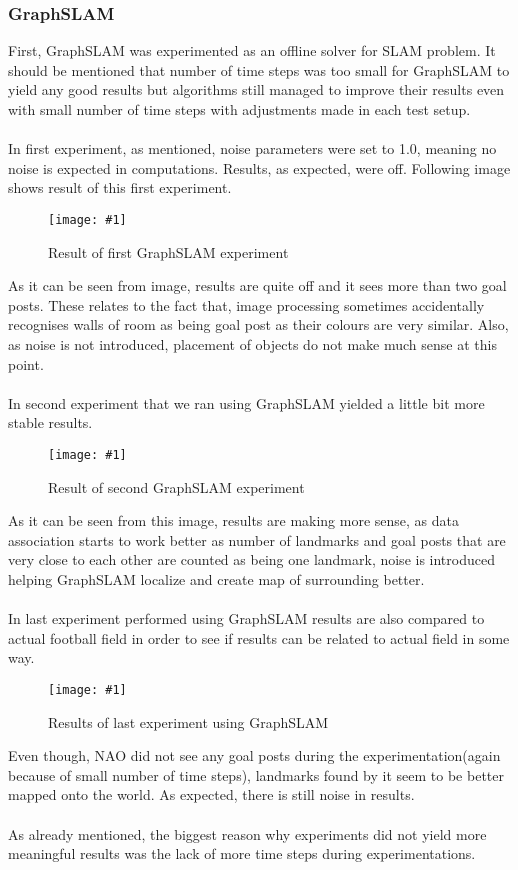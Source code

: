 \documentclass{ba-kecs}
\numberwithin{figure}{section}
\numberwithin{equation}{section}
\newcommand{\dkepic}[2]{ %
	\begin{figure}[H] %
	\texttt{[image: \#1]}
	\caption{#2}
	\label{#1}
	\end{figure}
}
\begin{document}
{\subsubsection{GraphSLAM}
First, GraphSLAM was experimented as an offline solver for SLAM problem. It should be mentioned that number of time steps was too small for GraphSLAM to yield any good results but algorithms still managed to improve their results even with small number of time steps with adjustments made in each test setup.\\ \\ 
In first experiment, as mentioned, noise parameters were set to 1.0, meaning no noise is expected in computations. Results, as expected, were off. Following image shows result of this first experiment.
\dkepic{1graphoffline}{Result of first GraphSLAM experiment}
As it can be seen from image, results are quite off and it sees more than two goal posts. These relates to the fact that, image processing sometimes accidentally recognises walls of room as being goal post as their colours are very similar. Also, as noise is not introduced, placement of objects do not make much sense at this point.\\ \\
In second experiment that we ran using GraphSLAM yielded a little bit more stable results.
\dkepic{4graphoffline}{Result of second GraphSLAM experiment}
As it can be seen from this image, results are making more sense, as data association starts to work better as number of landmarks and goal posts that are very close to each other are counted as being one landmark, noise is introduced helping GraphSLAM localize and create map of surrounding better.\\ \\

In last experiment performed using GraphSLAM results are also compared to actual football field in order to see if results can be related to actual field in some way.
\dkepic{7graphoffline}{Results of last experiment using GraphSLAM}
Even though, NAO did not see any goal posts during the experimentation(again because of small number of time steps), landmarks found by it seem to be better mapped onto the world. As expected, there is still noise in results.\\ \\

As already mentioned, the biggest reason why experiments did not yield more meaningful results was the lack of more time steps during experimentations.

}
\end{document}
